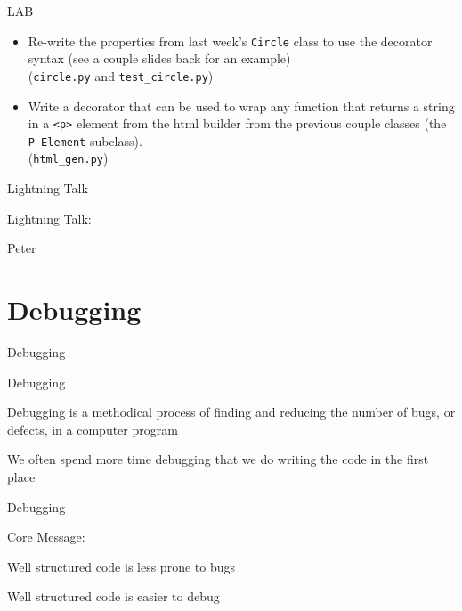 \documentclass{beamer}
\begin{document}
\begin{frame}[fragile]{LAB}

\begin{itemize}
  \item Re-write the properties from last week's \verb|Circle| class to use the
        decorator syntax (see a couple slides back for an example)\\
        (\verb|circle.py| and \verb|test_circle.py|)
  \vspace{0.5in}
  \item Write a decorator that can be used to wrap any function that returns a
        string in a \verb|<p>| element from the html builder from the previous
        couple classes (the \verb|P Element| subclass).\\
        (\verb|html_gen.py|)      
\end{itemize}

\end{frame}

\begin{frame}{Lightning Talk}

{\centering

\vfill
{\LARGE Lightning Talk:  }

\vfill
{\Huge Peter}

\vfill
}
\end{frame}


\section{Debugging}

\begin{frame}[fragile]{Debugging}

{\LARGE Debugging}

\vfill
{\Large Debugging is a methodical process of finding and reducing the number
of bugs, or defects, in a computer program}

\vfill
{\Large We often spend more time debugging that we do writing the code in the
first place}

\end{frame} 

\begin{frame}[fragile]{Debugging}

{\LARGE Core Message:}

\vfill
{\Large Well structured code is less prone to bugs}

\vfill
{\Large Well structured code is easier to debug}


\end{frame} 
\end{document}
